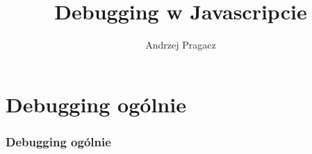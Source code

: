 \documentclass{beamer}
\title{Debugging w Javascripcie}
\author{Andrzej Pragacz}
\begin{document}
\titlepage

\section{Debugging ogólnie}

\begin{frame}
\frametitle{Debugging ogólnie}
\end{frame}
\end{document}
